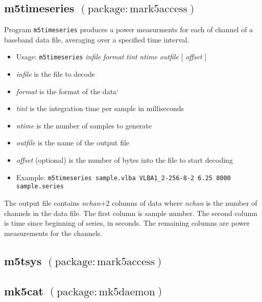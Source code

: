 \subsection{m5timeseries {\small $\mathrm{(package: mark5access)}$}} \label{sec:m5timeseries}

Program {\tt m5timeseries} produces a power measurments for each of channel of a baseband data file, averaging over a specified time interval.

\begin{itemize}
\item[] Usage: {\tt m5timeseries} {\em infile} {\em format} {\em tint} {\em ntime} {\em outfile} $[$ {\em offset} $]$
\item[] {\em infile} is the file to decode
\item[] {\em format} is the format of the data`
\item[] {\em tint} is the integration time per sample in milliseconds
\item[] {\em ntime} is the number of samples to generate
\item[] {\em outfile} is the name of the output file
\item[] {\em offset} (optional) is the number of bytes into the file to start decoding
\item[] Example: {\tt m5timeseries sample.vlba VLBA1\_2-256-8-2 6.25 8000 sample.series}
\end{itemize}

The output file contains {\em nchan}+2 columns of data where {\em nchan} is the number of channels in the data file.
The first column is sample number.
The second column is time since beginning of series, in seconds.
The remaining columns are power measurements for the channels.





\subsection{m5tsys {\small $\mathrm{(package: mark5access)}$}} \label{sec:tsysal}








\subsection{mk5cat {\small $\mathrm{(package: mk5daemon)}$}} \label{sec:mk5cat}

